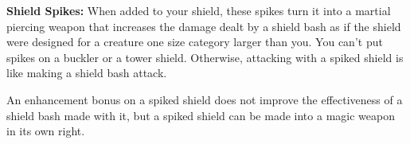 \textbf{Shield Spikes:} When added to your shield, these spikes turn it into a martial piercing weapon that increases the damage dealt by a shield bash as if the shield were designed for a creature one size category larger than you. You can't put spikes on a buckler or a tower shield. Otherwise, attacking with a spiked shield is like making a shield bash attack.

An enhancement bonus on a spiked shield does not improve the effectiveness of a shield bash made with it, but a spiked shield can be made into a magic weapon in its own right.